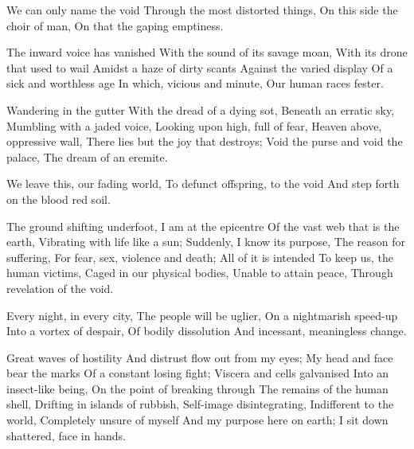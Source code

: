 \documentclass{article}
\newenvironment{stanza}{\begin{minipage}{10cm}\obeylines}{\end{minipage}\vspace{\baselineskip}}
\begin{document}
\begin{stanza}
We can only name the void
Through the most distorted things,
On this side the choir of man,
On that the gaping emptiness.
\end{stanza}


\begin{stanza}
The inward voice has vanished
With the sound of its savage moan,
With its drone that used to wail
Amidst a haze of dirty scants
Against the varied display
Of a sick and worthless age
In which, vicious and minute,
Our human races fester.
\end{stanza}

\begin{stanza}
Wandering in the gutter
With the dread of a dying sot,
Beneath an erratic sky,
Mumbling with a jaded voice,
Looking upon high, full of fear,
Heaven above, oppressive wall,
There lies but the joy that destroys;
Void the purse and void the palace,
The dream of an eremite.
\end{stanza}

\begin{stanza}
We leave this, our fading world,
To defunct offspring, to the void
And step forth on the blood red soil.
\end{stanza}


\begin{stanza}
The ground shifting underfoot,
I am at the epicentre
Of the vast web that is the earth,
Vibrating with life like a sun;
Suddenly, I know its purpose,
The reason for suffering,
For fear, sex, violence and death;
All of it is intended
To keep us, the human victims,
Caged in our physical bodies,
Unable to attain peace,
Through revelation of the void.
\end{stanza}

\begin{stanza}
Every night, in every city,
The people will be uglier,
On a nightmarish speed-up
Into a vortex of despair,
Of bodily dissolution
And incessant, meaningless change.
\end{stanza}

\begin{stanza}
Great waves of hostility
And distrust flow out from my eyes;
My head and face bear the marks
Of a constant losing fight;
Viscera and cells galvanised
Into an insect-like being,
On the point of breaking through
The remains of the human shell,
Drifting in islands of rubbish,
Self-image disintegrating,
Indifferent to the world,
Completely unsure of myself
And my purpose here on earth;
I sit down shattered, face in hands.
\end{stanza}
\end{document}
